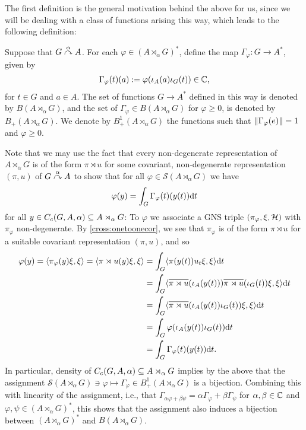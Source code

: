 The first definition is the general motivation behind the above for us, since we will be dealing with a class of functions arising this way, which leads to the following definition:
\begin{definition}
Suppose that $G \stackrel{\alpha}{\curvearrowright} A$. For each $\varphi \in (A \rtimes_\alpha G)^*$, define the map $\Gamma_\varphi \colon G \to A^*$, given by
\begin{align*}
	\Gamma_\varphi(t)(a) :=\varphi(\iota_A(a) \iota_G(t)) \in \mathbb{C},
\end{align*}
for $t \in G $ and $a \in A$. The set of functions $G \to A^*$ defined in this way is denoted by $B(A \rtimes_ \alpha G)$, and the set of $\Gamma_\varphi \in B(A \rtimes_ \alpha G)$ for $\varphi \geq 0$,  is denoted by $B_+(A \rtimes_\alpha G)$. We denote by $B_+^1(A \rtimes_\alpha G)$ the functions such that $\left\lVert \Gamma_\varphi (e) \right\rVert = 1$ and $\varphi \geq 0$. 
\end{definition}
\begin{remark}
Note that we may use the fact that every non-degenerate representation of $A \rtimes_\alpha G$ is of the form $\pi \rtimes u$ for some covariant, non-degenerate representation $(\pi,u)$ of $G \stackrel{\alpha}{\curvearrowright} A$ to show that for all $\varphi \in \mathcal{S}(A \rtimes_\alpha G)$ we have
\begin{align}
	\varphi(y) = \int_G \Gamma_\varphi(t)(y(t)) \mathrm{d} t
	\label{eq:gammafun}
\end{align}
for all $y \in C_c(G,A,\alpha) \subseteq A \rtimes_\alpha G$: To $\varphi$ we associate a GNS triple $(\pi_\varphi,\xi, \mathcal{H})$ with $\pi_{\varphi}$ non-degenerate. By \cref{cross:onetoonecor}, we see that $\pi_\varphi$ is of the form $\pi \rtimes u$ for a suitable covariant representation $(\pi,u)$, and so
\begin{align*}
\varphi(y) = \langle \pi_\varphi(y) \xi, \xi \rangle = \langle \pi \rtimes u(y) \xi, \xi\rangle &= \int_G \langle \pi(y(t)) u_t \xi, \xi \rangle \mathrm{d} t\\
&= \int_G \langle \overline{\pi \rtimes u }(\iota_A(y(t))) \overline{\pi \rtimes u } (\iota_G(t)) \xi , \xi \rangle \mathrm{d} t\\
&= \int_G \langle \overline{\pi \rtimes u} (\iota_A(y(t)) \iota_G(t)) \xi , \xi \rangle\mathrm{d} t\\
&= \int_G \varphi(\iota_A(y(t)) \iota_G(t)) \mathrm{d} t \\
&= \int_G \Gamma_\varphi (t) (y(t)) \mathrm{d} t.
\end{align*}
In particular, density of $C_c(G, A,\alpha) \subseteq A \rtimes_\alpha G$ implies by the above that the assignment $\mathcal{S}(A \rtimes_\alpha G) \ni \varphi \mapsto \Gamma_\varphi \in B_+^1(A \rtimes_\alpha G)$ is a bijection. Combining this with linearity of the assignment, i.e., that $\Gamma_{\alpha \varphi + \beta \psi}= \alpha \Gamma_\varphi + \beta \Gamma_\psi$ for $\alpha, \beta \in \mathbb{C}$ and $\varphi, \psi \in (A \rtimes_\alpha G)^*$, this shows that the assignment also induces a bijection between $(A \rtimes_\alpha G )^*$ and $B(A \rtimes_\alpha G)$.
\end{remark}
